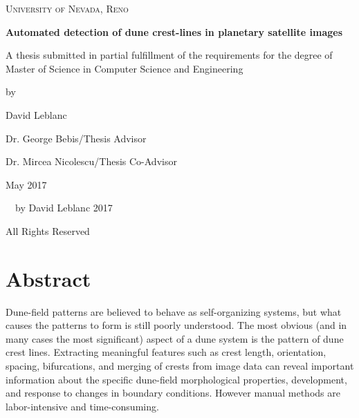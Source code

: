 \documentclass[11pt]{article}
\begin{document}
\begin{titlepage}
	\centering
	{\scshape\LARGE University of Nevada, Reno \par}
	\vspace{2.5cm}
	{\Large\bfseries Automated detection of dune crest-lines in planetary satellite images\par}
	\vspace{2.5cm}
	{\large A thesis submitted in partial fulfillment of the requirements for the degree of Master of Science in Computer Science and Engineering\par}
	\vspace{1.5cm}	
	{\Large by\par}
	{\Large David Leblanc\par}
	\vfill
	{\large Dr. George Bebis/Thesis Advisor
		 
		Dr. Mircea Nicolescu/Thesis Co-Advisor}
	\vfill
	{\large May 2017\par}
\end{titlepage}

\begin{center}
\vspace*{\fill}
{~\textcopyright~by David Leblanc 2017 \par}
{All Rights Reserved}
\vspace*{\fill}
\end{center}

\newpage


\newpage

\section*{Abstract}

Dune-field patterns are believed to behave as self-organizing systems, but what causes the patterns to form is still poorly understood. The most obvious (and in many cases the most significant) aspect of a dune system is the pattern of dune crest lines. Extracting meaningful features such as crest length, orientation, spacing, bifurcations, and merging of crests from image data can reveal important information about the specific dune-field morphological properties, development, and response to changes in boundary conditions. However manual methods are labor-intensive and time-consuming. 
\end{document}
